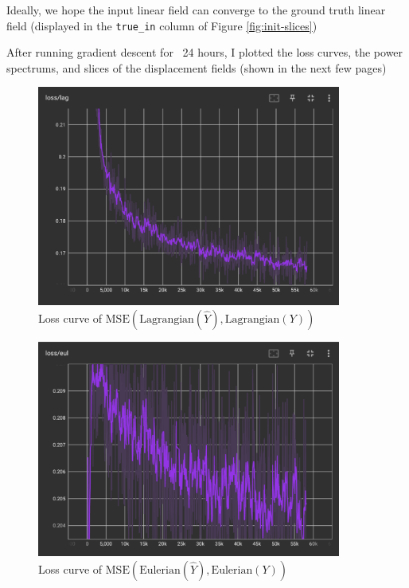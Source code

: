 \documentclass{article}
\begin{document}
Ideally, we hope the input linear field can converge to the ground truth linear field (displayed in the \texttt{true\_in} column of Figure \ref{fig:init-slices})

After running gradient descent for ~24 hours, I plotted the loss curves, the power spectrums, and slices of the displacement fields (shown in the next few pages)

\begin{figure}[h]
    \centering
    \includegraphics[width=10cm]{figs/lag-loss.png}
    \caption{Loss curve of $\mbox{MSE} \left( \mbox{Lagrangian}(\hat{Y}), \mbox{Lagrangian}(Y) \right)$}
    \label{fig:lag-lass}
\end{figure}

\begin{figure}[h]
    \centering
    \includegraphics[width=10cm]{figs/eul-loss.png}
    \caption{Loss curve of $\mbox{MSE} \left( \mbox{Eulerian}(\hat{Y}), \mbox{Eulerian}(Y) \right)$}
    \label{fig:eul-loss}
\end{figure}
\end{document}
